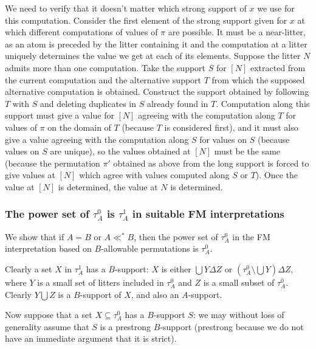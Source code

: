 \documentclass[12pt]{article}
\begin{document}
We need to verify that it doesn't matter which strong support of $x$ we use for this computation.  Consider the first element of the strong support given for
$x$ at which different computations of values of $\pi$ are possible.  It must be a near-litter, as an atom is preceded by the litter containing it and the computation at a litter
uniquely determines the value we get at each of its elements.  Suppose the litter $N$ admits more than one computation.  Take the support $S$ for $[N]$ extracted
from the current computation and the alternative support $T$ from which the supposed alternative computation is obtained.  Construct the support obtained by
following $T$ with $S$ and deleting duplicates in $S$ already found in $T$.  Computation along this support must give a value for $[N]$ agreeing with the computation
along $T$ for values of $\pi$ on the domain of $T$ (because $T$ is considered first), and it must also give a value agreeing with the computation along $S$ for values on $S$ (because values on $S$ are unique), so the values obtained at $[N]$ must be the same (because the permutation $\pi'$ obtained as above from the long support is forced to give values at $[N]$ which agree with values computed along $S$ or $T$).  Once the value at $[N]$ is determined, the value at $N$ is determined.


\newpage

\subsubsection{The power set of $\tau^0_A$ is $\tau^1_A$ in suitable FM interpretations}

We show that if $A=B$ or $A \ll^* B$, then the power set of $\tau^0_A$ in the FM interpretation based on $B$-allowable permutations is $\tau^0_A$.

Clearly a set $X$ in $\tau^1_A$ has a $B$-support:  $X$ is either $\bigcup Y \Delta Z$ or $(\tau^0_A \setminus \bigcup Y) \Delta Z$, where $Y$ is a small set
of litters included in $\tau^0_A$ and $Z$ is a small subset of $\tau^0_A$.  Clearly $Y \bigcup Z$ is a $B$-support of $X$, and also an $A$-support.

Now suppose that a set $X \subseteq \tau^0_A$ has a $B$-support $S$:  we may without loss of generality assume that $S$ is a prestrong $B$-support (prestrong because
we do not have an immediate argument that it is strict).
\end{document}

